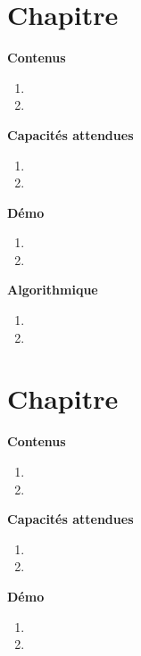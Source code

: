 \documentclass[10pt,a4paper]{article}
\begin{document}
\section{Chapitre}

\textbf{Contenus}

\begin{enumerate} 
\item 
\item 
\end{enumerate}


\textbf{Capacités attendues}

\begin{enumerate}
\item 
\item 
\end{enumerate}

\textbf{Démo}

\begin{enumerate}
\item 
\item 
\end{enumerate}

\textbf{Algorithmique}

\begin{enumerate}
\item 
\item 
\end{enumerate}

\section{Chapitre}

\textbf{Contenus}

\begin{enumerate} 
\item 
\item 
\end{enumerate}


\textbf{Capacités attendues}

\begin{enumerate}
\item 
\item 
\end{enumerate}

\textbf{Démo}

\begin{enumerate}
\item 
\item 
\end{enumerate}
\end{document}
